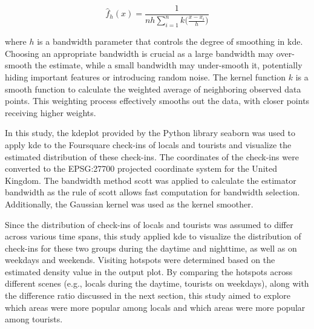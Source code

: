 \documentclass{article}
\theoremstyle{remark}
\begin{document}
\begin{equation} \label{eq:kde}
\hat{f}_{h}(x) = \frac{1}{nh \sum_{i=1}^n k\bigg(\frac{x-x_i}{h}\bigg)}
\end{equation}

where $h$ is a bandwidth parameter that controls the degree of smoothing in \acrshort{kde}. Choosing an appropriate bandwidth is crucial as a large bandwidth may over-smooth the estimate, while a small bandwidth may under-smooth it, potentially hiding important features or introducing random noise. The kernel function $k$ is a smooth function to calculate the weighted average of neighboring observed data points. This weighting process effectively smooths out the data, with closer points receiving higher weights.

In this study, the kdeplot provided by the Python library seaborn \citep{waskom_seaborn_2021} was used to apply \acrshort{kde} to the Foursquare check-ins of locals and tourists and visualize the estimated distribution of these check-ins. The coordinates of the check-ins were converted to the EPSG:27700 projected coordinate system for the United Kingdom. The bandwidth method scott was applied to calculate the estimator bandwidth as the rule of scott allows fast computation for bandwidth selection. Additionally, the Gaussian kernel was used as the kernel smoother.

Since the distribution of check-ins of locals and tourists was assumed to differ across various time spans, this study applied \acrshort{kde} to visualize the distribution of check-ins for these two groups during the daytime and nighttime, as well as on weekdays and weekends. Visiting hotspots were determined based on the estimated density value in the output plot. By comparing the hotspots across different scenes (e.g., locals during the daytime, tourists on weekdays), along with the difference ratio discussed in the next section, this study aimed to explore which areas were more popular among locals and which areas were more popular among tourists.


\end{document}
